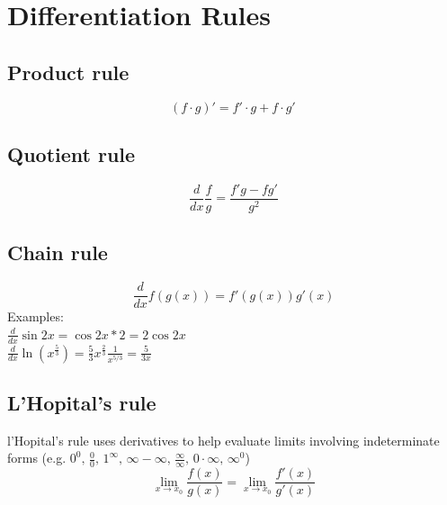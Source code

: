 \documentclass[8pt,letterpaper]{article}
\begin{document}


\section{Differentiation Rules}

\subsection*{Product rule}
\begin{equation}
(f\cdot g)'=f'\cdot g+f\cdot g' \,\! 
\end{equation}

\subsection*{Quotient rule}
\begin{equation}
\frac{d}{dx} \frac{f}{g} = \frac{f'g - fg'}{g^2}
\end{equation}

\subsection*{Chain rule}
\begin{equation}
\frac{d}{dx} f(g(x)) = f'(g(x))g'(x)
\end{equation}
Examples: \\
$\frac{d}{dx} \sin 2x = \cos 2x * 2 = 2 \cos 2x$ \\
$\frac{d}{dx} \ln(x^{\frac{5}{3}}) = \frac{5}{3} x^{\frac{2}{3}} \frac{1}{x^{5/3}} = \frac{5}{3x}$ \\

\subsection*{L'Hopital's rule}
l'Hopital's rule uses derivatives to help evaluate limits involving indeterminate forms
(e.g. $0^0,\, \frac{0}{0},\, 1^\infty,\, \infty - \infty,\, \frac{\infty}{\infty},\,
0 \cdot \infty,\, \infty^0$)
\begin{equation}
\lim_{x \to x_0} \frac{f(x)}{g(x)} = \lim_{x \to x_0} \frac{f'(x)}{g'(x)}
\end{equation}

\end{document}
